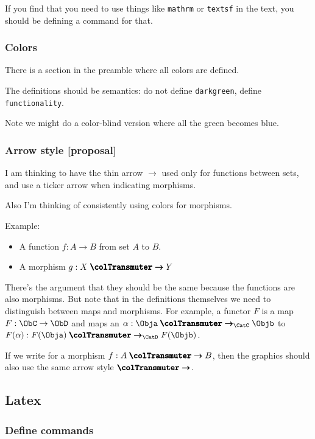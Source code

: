 If you find that you need to use things like \texttt{mathrm} or \texttt{textsf} in the text, you should be defining a command for that.

\subsubsection*{Colors}

There is a section in the preamble where all colors are defined.

The definitions should be semantics: do not define \texttt{darkgreen}, define \texttt{functionality}.

Note we might do a color-blind version where all the green becomes blue.


\subsubsection*{Arrow style [proposal]}

I am thinking to have the thin arrow $\to$ used only for functions between sets,
and use a ticker arrow when indicating morphisms.

\newcommand{\cto}{\mathrel{\pmb{\colTransmuter \to}}}

Also I'm thinking of consistently using colors for morphisms.

Example:
\begin{itemize}
  \item A function $f: A \to B$ from set $A$ to $B$.
  \item A morphism $g: X \cto  Y$
\end{itemize}

There's the argument that they should be the same because the functions are also morphisms. But note that in the definitions themselves we need to distinguish between maps and morphisms. For example, a functor $F$ is a map $F: \ObC \to \ObD$ and maps an $\alpha: \Obja \cto_{\CatC} \Objb $ to $F(\alpha): F(\Obja) \cto_{\CatD} F(\Objb) $.


If we write for a morphism $f: A \cto B$, then the graphics should also use the
same arrow style $\cto$.


\subsection*{Latex}

\subsubsection*{Define commands }

